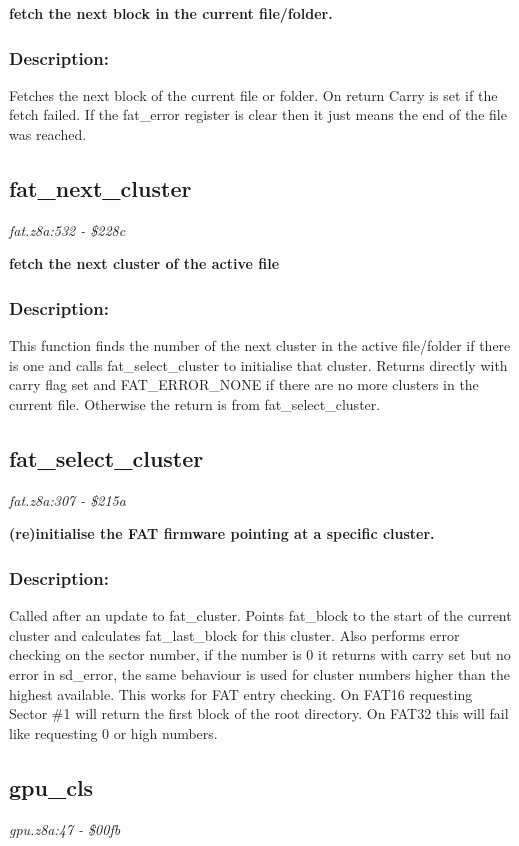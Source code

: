 \noindent
\textbf{fetch the next block in the current file/folder.}

\subsubsection{Description:}
 Fetches the next block of the current file or folder.  On return Carry is set if the fetch failed.  If the fat\_error register is clear then it just means the end of the file was reached.

\subsection{fat\_next\_cluster}
\textit{fat.z8a:532 - \$228c}

\noindent
\textbf{fetch the next cluster of the active file}

\subsubsection{Description:}
 This function finds the number of the next cluster in the active file/folder if there is one and calls fat\_select\_cluster to initialise that cluster. Returns directly with carry flag set and FAT\_ERROR\_NONE if there are no more clusters in the current file.  Otherwise the return is from fat\_select\_cluster.

\subsection{fat\_select\_cluster}
\textit{fat.z8a:307 - \$215a}

\noindent
\textbf{(re)initialise the FAT firmware pointing at a specific cluster.}

\subsubsection{Description:}
 Called after an update to fat\_cluster.  Points fat\_block to the start of the current cluster and calculates fat\_last\_block for this cluster.  Also performs error checking on the sector number, if the number is 0 it returns with carry set but no error in sd\_error, the same behaviour is used for cluster numbers higher than the highest available.  This works for FAT entry checking.  On FAT16 requesting Sector \#1 will return the first block of the root directory.  On FAT32 this will fail like requesting 0 or high numbers.

\subsection{gpu\_cls}
\textit{gpu.z8a:47 - \$00fb}

